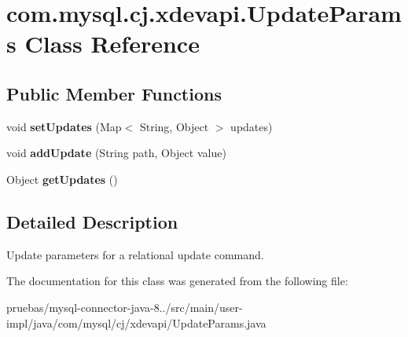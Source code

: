 \hypertarget{classcom_1_1mysql_1_1cj_1_1xdevapi_1_1_update_params}{}\section{com.\+mysql.\+cj.\+xdevapi.\+Update\+Params Class Reference}
\label{classcom_1_1mysql_1_1cj_1_1xdevapi_1_1_update_params}
\subsection*{Public Member Functions}
\begin{DoxyCompactItemize}
\item 
\mbox{\label{classcom_1_1mysql_1_1cj_1_1xdevapi_1_1_update_params_a10b7500218727edfcb8299e07183b2e1}} 
void {\bfseries set\+Updates} (Map$<$ String, Object $>$ updates)
\item 
\mbox{\label{classcom_1_1mysql_1_1cj_1_1xdevapi_1_1_update_params_a5ecd2bc752f6889166a59f76fea05b28}} 
void {\bfseries add\+Update} (String path, Object value)
\item 
\mbox{\label{classcom_1_1mysql_1_1cj_1_1xdevapi_1_1_update_params_a57dc42d6ed345654f4bcb7769fe584dc}} 
Object {\bfseries get\+Updates} ()
\end{DoxyCompactItemize}


\subsection{Detailed Description}
Update parameters for a relational update command. 

The documentation for this class was generated from the following file\+:\begin{DoxyCompactItemize}
\item 
pruebas/mysql-\/connector-\/java-\/8../src/main/user-\/impl/java/com/mysql/cj/xdevapi/Update\+Params.\+java\end{DoxyCompactItemize}
